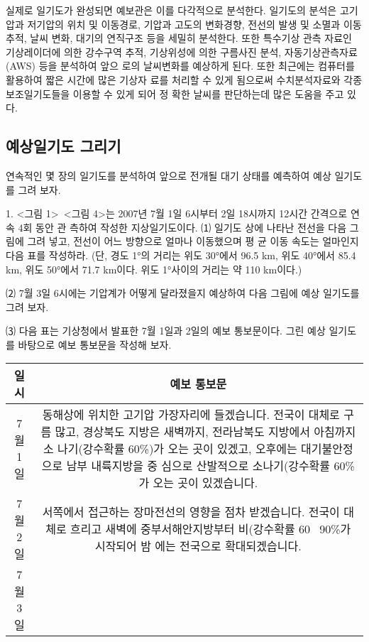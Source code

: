 \begin{corollary}
	
	실제로 일기도가 완성되면 예보관은 이를 다각적으로 분석한다. 일기도의 분석은 고기압과
	저기압의 위치 및 이동경로, 기압과 고도의 변화경향, 전선의 발생 및 소멸과 이동 추적, 날씨
	변화, 대기의 연직구조 등을 세밀히 분석한다. 또한 특수기상 관측 자료인 기상레이더에 의한
	강수구역 추적, 기상위성에 의한 구름사진 분석, 자동기상관측자료(AWS) 등을 분석하여 앞으
	로의 날씨변화를 예상하게 된다. 또한 최근에는 컴퓨터를 활용하여 짧은 시간에 많은 기상자
	료를 처리할 수 있게 됨으로써 수치분석자료와 각종 보조일기도들을 이용할 수 있게 되어 정
	확한 날씨를 판단하는데 많은 도움을 주고 있다.
	
	\subsection{예상일기도 그리기}
	
	연속적인 몇 장의 일기도를 분석하여 앞으로 전개될 대기 상태를 예측하여 예상 일기도를 그려 보자.
	
	1. <그림 1>~<그림 4>는 2007년 7월 1일 6시부터 2일 18시까지 12시간 간격으로 연속 4회 동안 관
	측하여 작성한 지상일기도이다.
	⑴ 일기도 상에 나타난 전선을 다음 그림에 그려 넣고, 전선이 어느 방향으로 얼마나 이동했으며 평
	균 이동 속도는 얼마인지 다음 표를 작성하라. (단, 경도 1°의 거리는 위도 30°에서 96.5 km, 위도
	40°에서 85.4 km, 위도 50°에서 71.7 km이다. 위도 1°사이의 거리는 약 110 km이다.)
	
	
	⑵ 7월 3일 6시에는 기압계가 어떻게 달라졌을지 예상하여 다음 그림에 예상 일기도를 그려 보자.
	
	⑶ 다음 표는  기상청에서 발표한 7월 1일과 2일의 예보 통보문이다. 그린 예상 일기도를 바탕으로 예보 통보문을 작성해 보자.
	
	\begin{tabular}{|c|c|}
		\hline 
		일시	& 예보 통보문 \\ 
		\hline 
		7월 1일	& 동해상에 위치한 고기압 가장자리에 들겠습니다.
		전국이 대체로 구름 많고, 경상북도 지방은 새벽까지, 전라남북도 지방에서 아침까지 소
		나기(강수확률 60{\%})가 오는 곳이 있겠고, 오후에는 대기불안정으로 남부 내륙지방을 중
		심으로 산발적으로 소나기(강수확률 60{\%}가 오는 곳이 있겠습니다. \\ 
		\hline 
		7월 2일	& 서쪽에서 접근하는 장마전선의 영향을 점차 받겠습니다.
		전국이 대체로 흐리고 새벽에 중부서해안지방부터 비(강수확률 60~ 90{\%}가 시작되어 밤
		에는 전국으로 확대되겠습니다. \\ 
		\hline 
		7월 3일	&  \\ 
		\hline 
	\end{tabular} 






\end{corollary}
